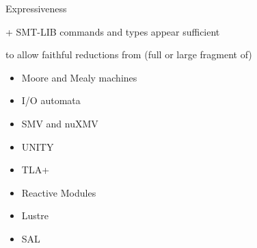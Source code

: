 \documentclass[10pt,aspectratio=149]{beamer}
\begin{document}
%


\begin{frame}[t]{Expressiveness}

\alert{ + SMT-LIB commands and types} appear sufficient

to allow faithful reductions from (full or large fragment of)
\medskip

\begin{itemize}
\item Moore and Mealy machines
\item I/O automata
\item SMV and nuXMV
\item UNITY
\item TLA+
\item Reactive Modules
\item Lustre
\item SAL
\end{itemize}

\end{frame}

\end{document}
